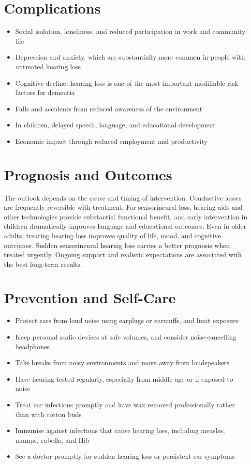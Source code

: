 \section*{Complications}
\begin{itemize}
    \item Social isolation, loneliness, and reduced participation in work and community life
    \item Depression and anxiety, which are substantially more common in people with untreated hearing loss
    \item Cognitive decline: hearing loss is one of the most important modifiable risk factors for dementia
    \item Falls and accidents from reduced awareness of the environment
    \item In children, delayed speech, language, and educational development
    \item Economic impact through reduced employment and productivity
\end{itemize}

\section*{Prognosis and Outcomes}
The outlook depends on the cause and timing of intervention. Conductive losses are frequently reversible with treatment. For sensorineural loss, hearing aids and other technologies provide substantial functional benefit, and early intervention in children dramatically improves language and educational outcomes. Even in older adults, treating hearing loss improves quality of life, mood, and cognitive outcomes. Sudden sensorineural hearing loss carries a better prognosis when treated urgently. Ongoing support and realistic expectations are associated with the best long-term results.

\section*{Prevention and Self-Care}
\begin{itemize}
    \item Protect ears from loud noise using earplugs or earmuffs, and limit exposure
    \item Keep personal audio devices at safe volumes, and consider noise-cancelling headphones
    \item Take breaks from noisy environments and move away from loudspeakers
    \item Have hearing tested regularly, especially from middle age or if exposed to noise
    \item Treat ear infections promptly and have wax removed professionally rather than with cotton buds
    \item Immunise against infections that cause hearing loss, including measles, mumps, rubella, and Hib
    \item See a doctor promptly for sudden hearing loss or persistent ear symptoms
\end{itemize}

